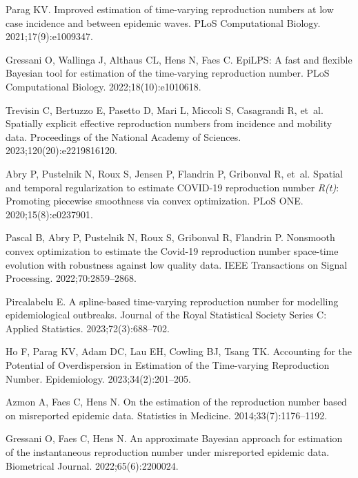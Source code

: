 \documentclass[10pt,letterpaper]{article}
\begin{document}
\begin{thebibliography}{10}
  Parag KV.
  \newblock Improved estimation of time-varying reproduction numbers at low case
    incidence and between epidemic waves.
  \newblock PLoS Computational Biology. 2021;17(9):e1009347.
  
  Gressani O, Wallinga J, Althaus CL, Hens N, Faes C.
  \newblock EpiLPS: A fast and flexible {B}ayesian tool for estimation of the
    time-varying reproduction number.
  \newblock PLoS Computational Biology. 2022;18(10):e1010618.
  
  Trevisin C, Bertuzzo E, Pasetto D, Mari L, Miccoli S, Casagrandi R, et~al.
  \newblock Spatially explicit effective reproduction numbers from incidence and
    mobility data.
  \newblock Proceedings of the National Academy of Sciences.
    2023;120(20):e2219816120.
  
  Abry P, Pustelnik N, Roux S, Jensen P, Flandrin P, Gribonval R, et~al.
  \newblock Spatial and temporal regularization to estimate {COVID-19}
    reproduction number \emph{R(t)}: Promoting piecewise smoothness via convex
    optimization.
  \newblock PLoS ONE. 2020;15(8):e0237901.
  
  Pascal B, Abry P, Pustelnik N, Roux S, Gribonval R, Flandrin P.
  \newblock Nonsmooth convex optimization to estimate the {C}ovid-19 reproduction
    number space-time evolution with robustness against low quality data.
  \newblock IEEE Transactions on Signal Processing. 2022;70:2859--2868.
  
  Pircalabelu E.
  \newblock A spline-based time-varying reproduction number for modelling
    epidemiological outbreaks.
  \newblock Journal of the Royal Statistical Society Series C: Applied
    Statistics. 2023;72(3):688--702.
  
  Ho F, Parag KV, Adam DC, Lau EH, Cowling BJ, Tsang TK.
  \newblock Accounting for the Potential of Overdispersion in Estimation of the
    Time-varying Reproduction Number.
  \newblock Epidemiology. 2023;34(2):201--205.
  
  Azmon A, Faes C, Hens N.
  \newblock On the estimation of the reproduction number based on misreported
    epidemic data.
  \newblock Statistics in Medicine. 2014;33(7):1176--1192.
  
  Gressani O, Faes C, Hens N.
  \newblock An approximate {B}ayesian approach for estimation of the
    instantaneous reproduction number under misreported epidemic data.
  \newblock Biometrical Journal. 2022;65(6):2200024.
  

\end{thebibliography}
\end{document}
